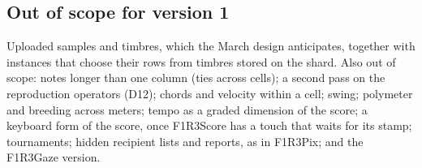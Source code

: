\documentclass[11pt,a4paper]{article}
\begin{document}
\subsection{Out of scope for version 1}\label{sec:future}

Uploaded samples and timbres, which the March design anticipates, together with instances that
choose their rows from timbres stored on the shard. Also out of scope: notes longer than one column (ties across cells); a second pass on the
reproduction operators (D12); chords and velocity within a cell; swing; polymeter and breeding across meters; tempo as a graded dimension of the
score; a keyboard form of the score, once F1R3Score has a touch that waits for its stamp;
tournaments; hidden recipient lists and reports, as in F1R3Pix; and the F1R3Gaze version.
\end{document}
